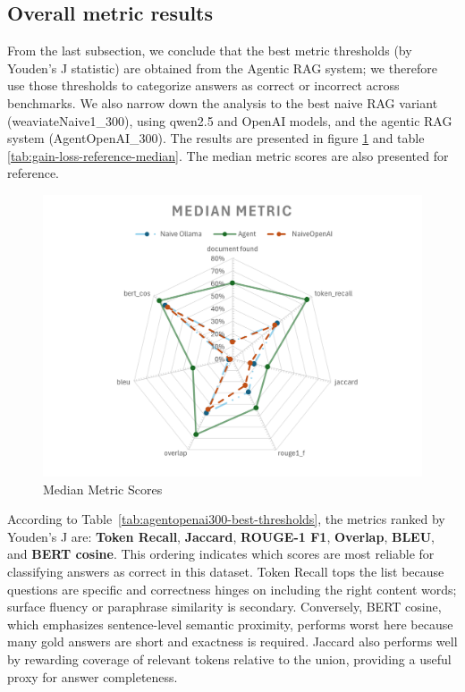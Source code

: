\subsection{Overall metric results}
From the last subsection, we conclude that the best metric thresholds (by Youden's J statistic) are obtained from the Agentic RAG system; we therefore use those thresholds to categorize answers as correct or incorrect across benchmarks. We also narrow down the analysis to the best naive RAG variant (weaviateNaive1\_300), using qwen2.5 and OpenAI models, and the agentic RAG system (AgentOpenAI\_300). The results are presented in figure \ref{fig:median-metric} and table \ref{tab:gain-loss-reference-median}. The median metric scores are also presented for reference.
\begin{figure}
    \centering
    \includegraphics[width=0.75\linewidth]{Figures/Median Metric.png}
    \caption{Median Metric Scores}
    \label{fig:median-metric}
\end{figure}
According to Table~\ref{tab:agentopenai300-best-thresholds}, the metrics ranked by Youden's J are: \textbf{Token Recall}, \textbf{Jaccard}, \textbf{ROUGE-1 F1}, \textbf{Overlap}, \textbf{BLEU}, and \textbf{BERT cosine}. This ordering indicates which scores are most reliable for classifying answers as correct in this dataset. Token Recall tops the list because questions are specific and correctness hinges on including the right content words; surface fluency or paraphrase similarity is secondary. Conversely, BERT cosine, which emphasizes sentence-level semantic proximity, performs worst here because many gold answers are short and exactness is required. Jaccard also performs well by rewarding coverage of relevant tokens relative to the union, providing a useful proxy for answer completeness.

